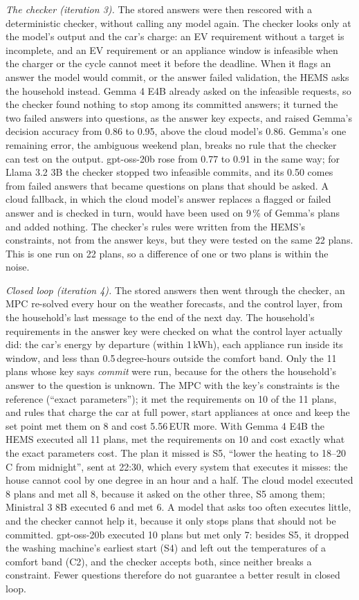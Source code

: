 \textit{The checker (iteration 3).} The stored answers were then
rescored with a deterministic checker, without calling any model again.
The checker looks only at the model's output and the car's charge: an
EV requirement without a target is incomplete, and an EV requirement or
an appliance window is infeasible when the charger or the cycle cannot
meet it before the deadline. When it flags an answer the model would
commit, or the answer failed validation, the HEMS asks the household
instead. Gemma 4 E4B already asked on the infeasible requests, so the
checker found nothing to stop among its committed answers; it turned
the two failed answers into questions, as the answer key expects, and
raised Gemma's decision accuracy from 0.86 to 0.95, above the cloud
model's 0.86. Gemma's one remaining error, the ambiguous weekend plan,
breaks no rule that the checker can test on the output. gpt-oss-20b
rose from 0.77 to 0.91 in the same way; for Llama 3.2 3B the checker
stopped two infeasible commits, and its 0.50 comes from failed answers
that became questions on plans that should be asked. A cloud fallback,
in which the cloud model's answer replaces a flagged or failed answer
and is checked in turn, would have been used on 9\,\% of Gemma's plans
and added nothing. The checker's rules were written from the HEMS's
constraints, not from the answer keys, but they were tested on the same
22 plans. This is one run on 22 plans, so a difference of one or two
plans is within the noise.

\textit{Closed loop (iteration 4).} The stored answers then went
through the checker, an MPC re-solved every hour on the weather
forecasts, and the control layer, from the household's last message to
the end of the next day. The household's requirements in the answer key
were checked on what the control layer actually did: the car's energy
by departure (within 1\,kWh), each appliance run inside its window, and
less than 0.5\,degree-hours outside the comfort band. Only the 11 plans
whose key says \textit{commit} were run, because for the others the
household's answer to the question is unknown. The MPC with the key's
constraints is the reference (``exact parameters''); it met the
requirements on 10 of the 11 plans, and rules that charge the car at
full power, start appliances at once and keep the set point met them on
8 and cost 5.56\,EUR more. With Gemma 4 E4B the HEMS executed all 11
plans, met the requirements on 10 and cost exactly what the exact
parameters cost. The plan it missed is S5, ``lower the heating to
18--20\,\textdegree C from midnight'', sent at 22:30, which every system
that executes it misses: the house cannot cool by one degree in an hour
and a half. The cloud model executed 8 plans and met all 8, because it
asked on the other three, S5 among them; Ministral 3 8B executed 6 and
met 6. A model that asks too often executes little, and the checker
cannot help it, because it only stops plans that should not be
committed. gpt-oss-20b executed 10 plans but met only 7: besides S5, it
dropped the washing machine's earliest start (S4) and left out the
temperatures of a comfort band (C2), and the checker accepts both,
since neither breaks a constraint. Fewer questions therefore do not
guarantee a better result in closed loop.


